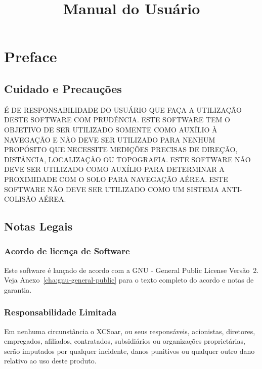 \documentclass[a4paper,11pt]{refrep}
\title{Manual do Usuário}
\begin{document}
\maketitle

 


\chapter*{Preface}

\section*{Cuidado e Precauções}

\warning É DE RESPONSABILIDADE DO USUÁRIO QUE FAÇA A
UTILI\-ZAÇÃO DESTE SOFTWARE COM PRUDÊNCIA. ESTE
SOFTWARE TEM O OBJETIVO DE SER UTILIZADO SOMENTE
COMO AUXÍLIO À NAVEGAÇÃO E NÃO DEVE SER UTILIZADO
PARA NENHUM PROPÓSITO QUE NECESSITE MEDIÇÕES
PRECISAS DE DIREÇÃO, DISTÂNCIA, LOCALIZAÇÃO OU
TOPOGRAFIA. ESTE SOFTWARE NÃO DEVE SER UTILIZADO
COMO AUXÍLIO PARA DETERMINAR A PROXIMIDADE COM O
SOLO PARA NAVE\-GAÇÃO AÉREA. ESTE SOFTWARE NÃO DEVE
SER UTILIZADO COMO UM SISTEMA ANTI-COLISÃO AÉREA.



\section*{Notas Legais}

\subsection*{Acordo de licença de Software}

Este software é lançado de acordo com a GNU - General Public License
Versão~2. Veja Anexo~\ref{cha:gnu-general-public} para o texto completo do acordo e notas de
garantia.

\subsection*{Responsabilidade Limitada}

Em nenhuma circunstância o XCSoar, ou seus responsáveis, acionistas,
diretores, empregados, afiliados, contratados, subsidiários ou
organizações proprietárias, serão imputados por qualquer incidente,
danos punitivos ou qualquer outro dano relativo ao uso deste produto.
\end{document}
